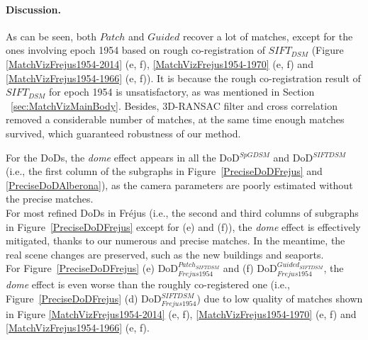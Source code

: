 \paragraph{Discussion.}
\label{para:DiscussionP}
As can be seen, both $Patch$ and $Guided$ recover a lot of matches, except for the ones involving epoch 1954 based on rough co-registration of $SIFT_{DSM}$ (Figure \ref{MatchVizFrejus1954-2014} (e, f), \ref{MatchVizFrejus1954-1970} (e, f) and \ref{MatchVizFrejus1954-1966} (e, f)). It is because the rough co-registration result of $SIFT_{DSM}$ for epoch 1954 is unsatisfactory, as was mentioned in Section ~\ref{sec:MatchVizMainBody}.
Besides, 3D-RANSAC filter and cross correlation removed a considerable number of matches, at the same time enough matches survived, which guaranteed robustness of our method. %
\par
For the \ac{DoD}s, the \textit{dome} effect appears in all the DoD$^{SpGDSM}$ and DoD$^{SIFTDSM}$ (i.e., the first column of the subgraphs in Figure~\ref{PreciseDoDFrejus} and \ref{PreciseDoDAlberona}), as the camera parameters are poorly estimated without the precise matches.\\
For most refined \ac{DoD}s in Fr{\'e}jus (i.e., the second and third columns of subgraphs in Figure~\ref{PreciseDoDFrejus} except for (e) and (f)), the \textit{dome} effect is effectively mitigated, thanks to our numerous and precise matches. In the meantime, the real scene changes are preserved, such as the new buildings and seaports.\\
For Figure~\ref{PreciseDoDFrejus} (e) \ac{DoD}$_{Frejus1954}^{Patch_{SIFTDSM}}$ and (f) \ac{DoD}$_{Frejus1954}^{Guided_{SIFTDSM}}$, the \textit{dome} effect is even worse than the roughly co-registered one (i.e., Figure~\ref{PreciseDoDFrejus} (d) \ac{DoD}$_{Frejus1954}^{{SIFTDSM}}$) due to low quality of matches shown in Figure \ref{MatchVizFrejus1954-2014} (e, f), \ref{MatchVizFrejus1954-1970} (e, f) and \ref{MatchVizFrejus1954-1966} (e, f).\\
